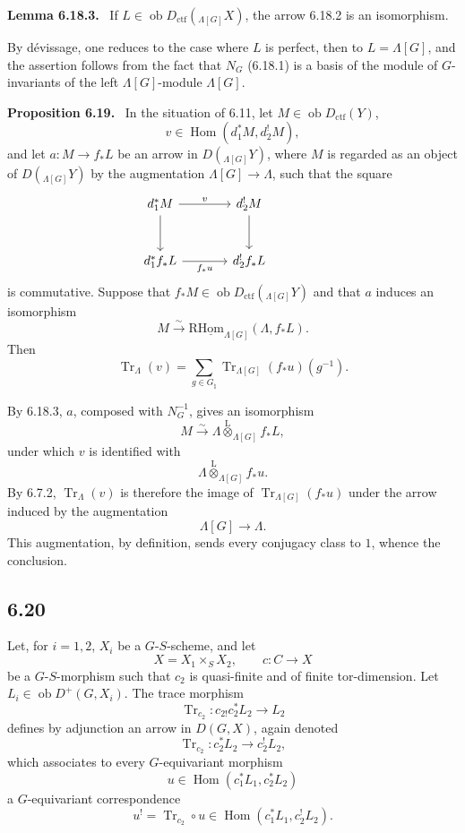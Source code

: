 \documentclass[11pt]{article}
\newenvironment{statement}[1]{\par\medskip\noindent\textbf{#1.}\ }{\par\medskip}
\DeclareMathOperator{\Hom}{Hom}
\providecommand{\Tr}{\operatorname{Tr}}
\providecommand{\Tr}{\operatorname{Tr}}
\providecommand{\lten}{\overset{\mathrm L}{\otimes}}
\providecommand{\Ob}{\operatorname{ob}}
\providecommand{\Tr}{\operatorname{Tr}}
\providecommand{\Hom}{\operatorname{Hom}}
\providecommand{\lten}{\overset{\mathrm L}{\otimes}}
\providecommand{\lten}{\overset{\mathrm L}{\otimes}}
\providecommand{\Ob}{\operatorname{ob}}
\providecommand{\Tr}{\operatorname{Tr}}
\providecommand{\lten}{\overset{\mathrm L}{\otimes}}
\providecommand{\lten}{\overset{\mathrm L}{\otimes}}
\providecommand{\Ob}{\operatorname{Ob}}
\providecommand{\lten}{\overset{\mathrm L}{\otimes}}
\providecommand{\Hom}{\operatorname{Hom}}
\providecommand{\Tr}{\operatorname{Tr}}
\providecommand{\Ob}{\operatorname{ob}}
\providecommand{\Ob}{\operatorname{Ob}}
\providecommand{\lten}{\overset{\mathrm L}{\otimes}}
\begin{document}
\begin{statement}{Lemma 6.18.3}
If $L\in\Ob D_{\mathrm{ctf}}({}_{\Lambda[G]}X)$, the arrow 6.18.2 is an isomorphism.
\end{statement}

By dévissage, one reduces to the case where $L$ is perfect, then to $L=\Lambda[G]$, and the assertion follows from the fact that $N_G$ (6.18.1) is a basis of the module of $G$-invariants of the left $\Lambda[G]$-module $\Lambda[G]$.

\begin{statement}{Proposition 6.19}
In the situation of 6.11, let $M\in\Ob D_{\mathrm{ctf}}(Y)$,
\[
v\in\Hom(d_1^*M,d_2^!M),
\]
and let $a:M\to f_*L$ be an arrow in $D({}_{\Lambda[G]}Y)$, where $M$ is regarded as an object of $D({}_{\Lambda[G]}Y)$ by the augmentation $\Lambda[G]\to\Lambda$, such that the square
\[
\begin{tikzcd}[column sep=large,row sep=large]
d_1^*M \arrow[r,"v"] \arrow[d] & d_2^!M \arrow[d] & {}\\
d_1^*f_*L \arrow[r,"f_*u"'] & d_2^!f_*L
\end{tikzcd}
\]
is commutative. Suppose that $f_*M\in\Ob D_{\mathrm{ctf}}({}_{\Lambda[G]}Y)$ and that $a$ induces an isomorphism
\[
M\xrightarrow{\sim}\mathrm{R}\underline{\mathrm{Hom}}_{\Lambda[G]}(\Lambda,f_*L).
\]
Then
\begin{equation}
\Tr_{\Lambda}(v)=
\sum_{g\in G_{\natural}}\Tr_{\Lambda[G]}(f_*u)(g^{-1}).
\tag{6.19.1}
\end{equation}
\end{statement}

By 6.18.3, $a$, composed with $N_G^{-1}$, gives an isomorphism
\[
M\xrightarrow{\sim}\Lambda\lten_{\Lambda[G]}f_*L,
\]
under which $v$ is identified with
\[
\Lambda\lten_{\Lambda[G]}f_*u.
\]
By 6.7.2, $\Tr_{\Lambda}(v)$ is therefore the image of $\Tr_{\Lambda[G]}(f_*u)$ under the arrow induced by the augmentation
\[
\Lambda[G]\longrightarrow \Lambda.
\]
This augmentation, by definition, sends every conjugacy class to $1$, whence the conclusion.

\subsection*{6.20}
Let, for $i=1,2$, $X_i$ be a $G$-$S$-scheme, and let
\[
X=X_1\times_SX_2,\qquad c:C\to X
\]
be a $G$-$S$-morphism such that $c_2$ is quasi-finite and of finite tor-dimension. Let $L_i\in\Ob D^+(G,X_i)$. The trace morphism
\[
\Tr_{c_2}:c_{2!}c_2^*L_2\longrightarrow L_2
\]
defines by adjunction an arrow in $D(G,X)$, again denoted
\begin{equation}
\Tr_{c_2}:c_2^*L_2\longrightarrow c_2^!L_2,
\tag{6.20.1}
\end{equation}
which associates to every $G$-equivariant morphism
\[
u\in\Hom(c_1^*L_1,c_2^*L_2)
\]
a $G$-equivariant correspondence
\begin{equation}
u^! = \Tr_{c_2}\circ u\in\Hom(c_1^*L_1,c_2^!L_2).
\tag{6.20.2}
\end{equation}
\end{document}
